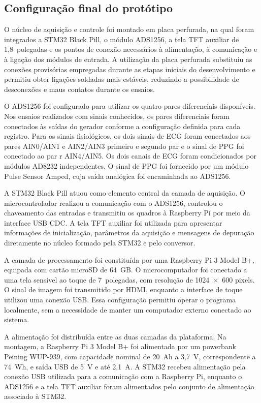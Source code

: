 \documentclass[a4paper,12pt]{fcte}
\begin{document}
\subsection{Configuração final do protótipo}
\label{subsec:configuracao_final_prototipo}

O núcleo de aquisição e controle foi montado em placa perfurada, na qual foram integrados a STM32 Black Pill, o módulo ADS1256, a tela TFT auxiliar de 1,8~polegadas e os pontos de conexão necessários à alimentação, à comunicação e à ligação dos módulos de entrada. A utilização da placa perfurada substituiu as conexões provisórias empregadas durante as etapas iniciais do desenvolvimento e permitiu obter ligações soldadas mais estáveis, reduzindo a possibilidade de desconexões e maus contatos durante os ensaios.

O ADS1256 foi configurado para utilizar os quatro pares diferenciais disponíveis. Nos ensaios realizados com sinais conhecidos, os pares diferenciais foram conectados às saídas do gerador conforme a configuração definida para cada registro. Para os sinais fisiológicos, os dois sinais de ECG foram conectados aos pares  AIN0/AIN1 e AIN2/AIN3 primeiro e segundo par e o sinal de PPG foi conectado ao par r AIN4/AIN5. Os dois canais de ECG foram condicionados por módulos AD8232 independentes. O sinal de PPG foi fornecido por um módulo Pulse Sensor Amped, cuja saída analógica foi encaminhada ao ADS1256. 

A STM32 Black Pill atuou como elemento central da camada de aquisição. O microcontrolador realizou a comunicação com o ADS1256, controlou o chaveamento das entradas e transmitiu os quadros à Raspberry Pi por meio da interface USB CDC. A tela TFT auxiliar foi utilizada para apresentar informações de inicialização, parâmetros da aquisição e mensagens de depuração diretamente no núcleo formado pela STM32 e pelo conversor.

A camada de processamento foi constituída por uma Raspberry Pi 3 Model B+, equipada com cartão microSD de 64~GB. O microcomputador foi conectado a uma tela sensível ao toque de 7~polegadas, com resolução de 1024~$\times$~600 pixels. O sinal de imagem foi transmitido por HDMI, enquanto a interface de toque utilizou uma conexão USB. Essa configuração permitiu operar o programa localmente, sem a necessidade de manter um computador externo conectado ao sistema.

A alimentação foi distribuída entre as duas camadas da plataforma. Na montagem, a Raspberry Pi 3 Model B+ foi alimentada por um powerbank Peining WUP-939, com capacidade nominal de 20~Ah a 3,7~V, correspondente a 74~Wh, e saída USB de 5~V e até 2,1~A. A STM32 recebeu alimentação pela conexão USB utilizada para a comunicação com a Raspberry Pi, enquanto o ADS1256 e a tela TFT auxiliar foram alimentados pelo conjunto de alimentação associado à STM32.
\end{document}
